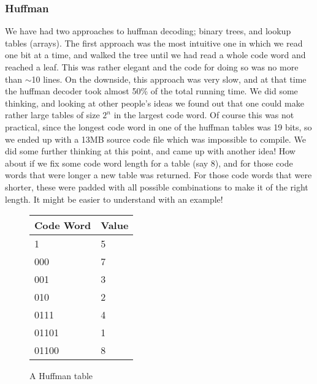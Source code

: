 \documentclass[a4paper,12pt]{article}
\begin{document}
    \subsubsection{Huffman}
    We have had two approaches to huffman decoding; binary trees, and lookup
    tables (arrays). The first approach was the most intuitive one in which we
    read one bit at a time, and walked the tree until we had read a whole code
    word and reached a leaf. This was rather elegant and the code for doing so
    was no more than $\sim$10 lines. On the downside, this approach was very
    slow, and at that time the huffman decoder took almost 50\% of the total
    running time. We did some thinking, and looking at other people's ideas we
    found out that one could make rather large tables of size $2^n$ in the
    largest code word. Of course this was not practical, since the longest code
    word in one of the huffman tables was 19 bits, so we ended up with a 13MB
    source code file which was impossible to compile. We did some further
    thinking at this point, and came up with another idea! How about if we fix
    some code word length for a table (say 8), and for those code words that
    were longer a new table was returned. For those code words that were
    shorter, these were padded with all possible combinations to make it of the
    right length. It might be easier to understand with an example!
\begin{figure}[H]
  \begin{center}
    \begin{tabular}{| l | l |}
        \hline
        Code Word & Value \\ \hline \hline
        1   & 5 \\
        000 & 7 \\
        001 & 3 \\
        010 & 2 \\
        0111  & 4 \\
        01101 & 1 \\
        01100 & 8 \\ \hline
    \end{tabular}
    \caption{A Huffman table}\label{fig:huffmantab}
  \end{center}
\end{figure}
\end{document}
